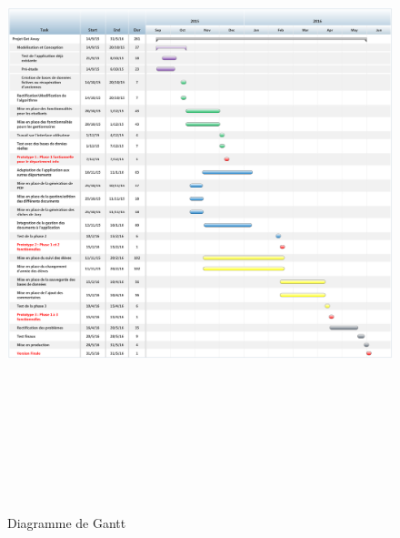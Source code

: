 \begin{figure}[!h]
  \centering
  \includegraphics[angle=90, height=19cm]{Plannification/Projet.png}
  \caption{Diagramme de Gantt}
  \label{useCase}
\end{figure}